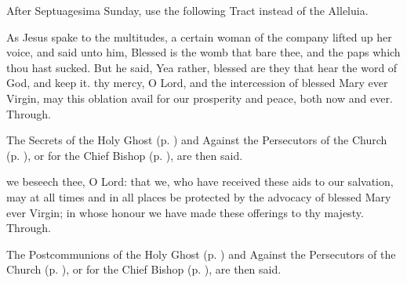 \begin{rubric}
    After Septuagesima Sunday, use the following Tract instead of the Alleluia.
\end{rubric}
 As Jesus spake to the multitudes, a certain woman of the company lifted up her voice, and said unto him, Blessed is the womb that bare thee, and the paps which thou hast sucked. But he said, Yea rather, blessed are they that hear the word of God, and keep it.
\secret
{} thy mercy, O Lord, and the intercession of blessed Mary ever Virgin, may this oblation avail for our prosperity and peace, both now and ever. Through.
\begin{rubric}
    The Secrets of the Holy Ghost (p. \pageref{SPHolyGhost}) and Against the Persecutors of the Church (p. \pageref{SPAgainst}), or for the Chief Bishop (p. \pageref{SPChiefBishop}), are then said.
\end{rubric}
\postcommunion
{} we beseech thee, O Lord: that we, who have received these aids to our salvation, may at all times and in all places be protected by the advocacy of blessed Mary ever Virgin; in whose honour we have made these offerings to thy majesty. Through.
\begin{rubric}
    The Postcommunions of the Holy Ghost (p. \pageref{SPHolyGhost}) and Against the Persecutors of the Church (p. \pageref{SPAgainst}), or for the Chief Bishop (p. \pageref{SPChiefBishop}), are then said.
\end{rubric}

